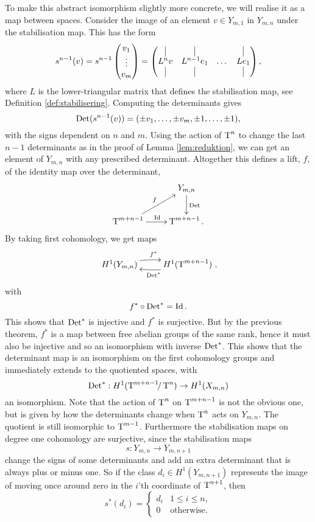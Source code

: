 To make this abstract isomorphism slightly more concrete, we will
realise it as a map between spaces. Consider the image of an element
$v \in Y_{m,1}$ in $Y_{m,n}$ under the stabilisation map. This has the
form 
\[ s^{n-1}(v) = s^{n-1}
\begin{pmatrix}
  v_1 \\
  \vdots \\
  v_m
\end{pmatrix} =
\begin{pmatrix}
  \vrule & \vrule & & \vrule \\
  L^{n} v & L^{n-1}e_1 & \dots & Le_1 \\
  \vrule & \vrule & & \vrule
\end{pmatrix},
\]
where $L$ is the lower-triangular matrix that defines the
stabilisation map, see Definition \ref{def:stabilisering}. Computing
the determinants gives
\[ \operatorname{Det}(s^{n-1}(v)) = (\pm v_1,\dots,\pm v_m, \pm 1, \dots,\pm 1), \]
with the signs dependent on $n$ and $m$. Using the action of
$\operatorname{T}^{n}$ to change the last $n-1$ determinants as in the proof of
Lemma \ref{lem:reduktion}, we can get an element of $Y_{m,n}$ with any
prescribed
determinant. Altogether this defines a lift, $f$, of the
identity map over the determinant,
\[ \xymatrix{ & Y_{m,n}
  \ar[d]^\Det \\
  \T^{m+n-1} \ar[ur]^f \ar[r]^\Id & \T^{m+n-1}.}\]
By taking first cohomology, we get maps
\[ \xymatrix{ H^1(Y_{m,n}) \ar@/^/[r]^{f^*} & H^1(\T^{m+n-1})
  \ar@/^/[l]^{\Det^*} }, \]
with 
\[ f^* \circ \operatorname{Det}^* = \operatorname{Id}. \]
This shows that $\operatorname{Det}^*$ is injective and $f^*$ is surjective. But by
the previous theorem, $f^*$ is a map between free abelian groups of
the same rank, hence it must also be injective and so an
isomorphism with inverse $\operatorname{Det}^*$. This shows that the determinant map
is an isomorphism on the first cohomology groups and immediately
extends to the quotiented spaces, with
\[ \operatorname{Det}^* : H^1(\operatorname{T}^{m+n-1}\!\!/\operatorname{T}^{n}) \to H^1(X_{m,n}) \]
an isomorphism. Note that the action of $\operatorname{T}^n$ on $\operatorname{T}^{m+n-1}$ is not
the obvious one, but is given by how the determinants change when
$\operatorname{T}^n$ acts on $Y_{m,n}$. The quotient is still isomorphic to
$\operatorname{T}^{m-1}$. Furthermore the stabilisation
maps on
degree one cohomology are surjective, since the stabilisation maps
\[ s: Y_{m,n} \to Y_{m,n+1} \]
change the signs of some determinants and add an extra determinant
that is always plus or minus one. So if the class $d_i \in
H^1(Y_{m,n+1})$ represents the image of moving once around zero in the
$i$'th coordinate of $\operatorname{T}^{n+1}$, then
\[ s^*(d_i) =
\begin{cases}
  d_i & 1 \leq i \leq n, \\
  0 & \text{otherwise}.
\end{cases} \]


